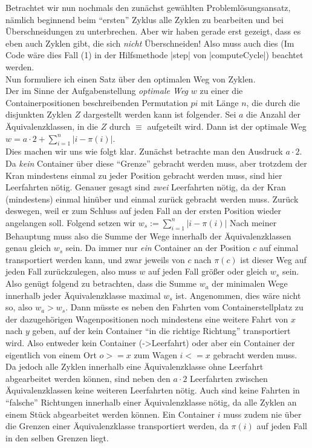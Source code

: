 Betrachtet wir nun nochmals den zunächst gewählten Problemlösungsansatz, nämlich beginnend beim ``ersten'' Zyklus alle Zyklen zu bearbeiten und bei Überschneidungen zu unterbrechen.
Aber wir haben gerade erst gezeigt, dass es eben auch Zyklen gibt, die sich \emph{nicht} Überschneiden!
Also muss auch dies (Im Code wäre dies Fall (1) in der Hilfsmethode |step| von |computeCycle|) beachtet werden.\\
Nun formuliere ich einen Satz über den optimalen Weg von Zyklen.\\
Der im Sinne der Aufgabenstellung \emph{optimale Weg} $w$ zu einer die Containerpositionen beschreibenden Permutation $pi$ mit Länge $n$,
die durch die disjunkten Zyklen $Z$ dargestellt werden kann ist folgender.
Sei $a$ die Anzahl der Äquivalenzklassen, in die $Z$ durch $\equiv$ aufgeteilt wird.
Dann ist der optimale Weg $w = a \cdot 2 + \sum_{i = 1}^{n}{\lvert i-\pi(i)\rvert}$.\\
Dies machen wir uns wie folgt klar. Zunächst betrachte man den Ausdruck $a \cdot 2$.
Da \emph{kein} Container über diese ``Grenze'' gebracht werden muss, aber trotzdem der Kran mindestens einmal zu jeder Position gebracht werden muss, sind hier Leerfahrten nötig.
Genauer gesagt sind \emph{zwei} Leerfahrten nötig, da der Kran (mindestens) einmal hinüber und einmal zurück gebracht werden muss.
Zurück deswegen, weil er zum Schluss auf jeden Fall an der ersten Position wieder angelangen soll.
Folgend setzen wir $w_s := \sum_{i = 1}^{n}{\lvert i-\pi(i)\rvert}$
Nach meiner Behauptung muss also die Summe der Wege innerhalb der Äquivalenzklassen genau gleich $w_s$ sein.
Da immer nur \emph{ein} Container an der Position $c$ auf einmal transportiert werden kann,
und zwar jeweils von $c$ nach $\pi(c)$ ist dieser Weg auf jeden Fall zurückzulegen, also muss $w$ auf jeden Fall größer oder gleich $w_s$ sein.
Also genügt folgend zu betrachten, dass die Summe $w_a$ der minimalen Wege innerhalb jeder Äquivalenzklasse maximal $w_s$ ist.
Angenommen, dies wäre nicht so, also $w_a > w_s$.
Dann müsste es neben den Fahrten vom Containerstellplatz zu der dazugehörigen Wagenpositionen noch mindestens eine weitere Fahrt von $x$ nach $y$ geben,
auf der kein Container ``in die richtige Richtung'' transportiert wird.
Also entweder kein Container (->Leerfahrt) oder aber ein Container der eigentlich von einem Ort $o >= x$ zum Wagen $i <= x$ gebracht werden muss.
Da jedoch alle Zyklen innerhalb eine Äquivalenzklasse ohne Leerfahrt abgearbeitet werden können,
sind neben den $a \cdot 2$ Leerfahrten zwischen Äquivalenzklassen keine weiteren Leerfahrten nötig.
Auch sind keine Fahrten in ``falsche'' Richtungen innerhalb einer Äquivalenzklasse nötig, da alle Zyklen an einem Stück abgearbeitet werden können. %
Ein Container $i$ muss zudem nie über die Grenzen einer Äquivalenzklasse transportiert werden, da $\pi(i)$ auf jeden Fall in den selben Grenzen liegt.

